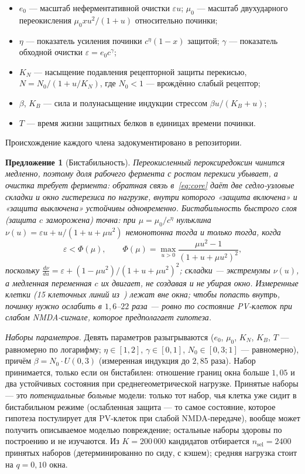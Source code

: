 \documentclass[11pt,a4paper]{article}
\newtheorem{proposition}{Предложение}[section]
\theoremstyle{remark}
\begin{document}
\begin{itemize}
\item $e_0$ --- масштаб неферментативной очистки $\varepsilon u$; $\mu_0$ --- масштаб
двухударного переокисления $\mu_0 xu^2/(1+u)$ относительно починки;
\item $\eta$ --- показатель усиления починки $c^\eta(1-x)$ защитой; $\gamma$ --- показатель
обходной очистки $\varepsilon=e_0c^\gamma$;
\item $K_N$ --- насыщение подавления рецепторной защиты перекисью,
$N=N_0/(1+u/K_N)$, где $N_0<1$ --- врождённо слабый рецептор;
\item $\beta$, $K_B$ --- сила и полунасыщение индукции стрессом $\beta u/(K_B+u)$;
\item $T$ --- время жизни защитных белков в единицах времени починки.
\end{itemize}
Происхождение каждого члена задокументировано в репозитории.

\begin{proposition}[Бистабильность]
Переокисленный пероксиредоксин чинится медленно, поэтому доля рабочего фермента с
ростом перекиси \emph{убывает}, а очистка \emph{требует} фермента: обратная связь
в~\eqref{eq:core} даёт две седло-узловые складки и окно гистерезиса по нагрузке, внутри
которого «защита включена» и «защита выключена» устойчивы одновременно. Бистабильность
быстрого слоя (защита $c$ заморожена) точна: при $\mu=\mu_0/c^{\eta}$ нульклина
$\nu(u)=\varepsilon u+u/(1+u+\mu u^2)$ немонотонна тогда и только тогда, когда
\begin{equation}\label{eq:phi}
\varepsilon<\Phi(\mu),\qquad
\Phi(\mu)=\max_{u>0}\frac{\mu u^2-1}{(1+u+\mu u^2)^2},
\end{equation}
поскольку $\tfrac{d\nu}{du}=\varepsilon+(1-\mu u^2)/(1+u+\mu u^2)^2$; складки ---
экстремумы $\nu(u)$, а медленная переменная $c$ их двигает, не создавая и не убирая
окно. Измеренные клетки (15 клеточных линий из~\cite{selvaggio}) лежат вне окна; чтобы
попасть внутрь, починку нужно ослабить в $1{,}6$--$22$ раза --- ровно то состояние
PV-клеток при слабом NMDA-сигнале, которое предполагает гипотеза.
\end{proposition}


\emph{Наборы параметров.} Девять параметров разыгрываются ($e_0$, $\mu_0$, $K_N$,
$K_B$, $T$ --- равномерно по логарифму; $\eta\in[1,2]$, $\gamma\in[0,1]$,
$N_0\in[0{,}3;1]$ --- равномерно), причём $\beta=N_0\cdot U(0,3)$ (измеренная индукция
до $2{,}85$ раза). Набор принимается, только если он бистабилен: отношение границ окна
больше $1{,}05$ и два устойчивых состояния при среднегеометрической нагрузке. Принятые
наборы --- это \emph{потенциальные больные} модели: только тот набор, чья клетка уже
сидит в бистабильном режиме (ослабленная защита --- то самое состояние, которое
гипотеза постулирует для PV-клеток при слабой NMDA-передаче), вообще может получить
описываемое моделью повреждение; остальные наборы здоровы по построению и не
изучаются. Из
$K=200\,000$ кандидатов отбирается $n_{\mathrm{sel}}=2400$ принятых наборов
(детерминированно по сиду, с кэшем); средняя нагрузка стоит на $q=0{,}10$ окна.
\end{document}
